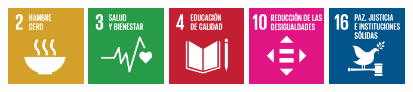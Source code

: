 \includegraphics[width=2cm]{./figuras/ods/02.png}
\includegraphics[width=2cm]{./figuras/ods/03.png}
\includegraphics[width=2cm]{./figuras/ods/04.png}
\includegraphics[width=2cm]{./figuras/ods/10.png}
\includegraphics[width=2cm]{./figuras/ods/16.png}
